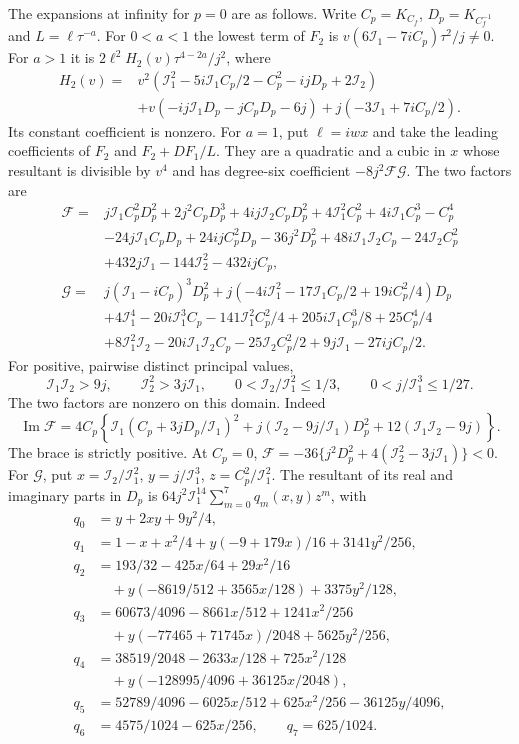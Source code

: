 \documentclass[11pt,a4paper]{article}
\numberwithin{equation}{section}
\theoremstyle{plain}
\theoremstyle{definition}
\theoremstyle{remark}
\begin{document}
The expansions at infinity for $p=0$ are as follows.
Write $C_p=K_{C_f}$, $D_p=K_{C_f^{-1}}$ and $L=\ell\tau^{-a}$.  For $0<a<1$ the
lowest term of $F_2$ is $v(6\mathcal I_1-7iC_p)\tau^2/j\ne0$.  For $a>1$ it is
$2\ell^2H_2(v)\tau^{4-2a}/j^2$, where
\begin{align*}
 H_2(v)={}&v^2(\mathcal I_1^2-5i\mathcal I_1C_p/2-C_p^2-ijD_p+2\mathcal I_2)\\
 &+v(-ij\mathcal I_1D_p-jC_pD_p-6j)+j(-3\mathcal I_1+7iC_p/2).
\end{align*}
Its constant coefficient is nonzero.  For $a=1$, put $\ell=iwx$ and take
the leading coefficients of $F_2$ and $F_2+DF_1/L$.  They are a quadratic
and a cubic in $x$ whose resultant is divisible by $v^4$ and has
degree-six coefficient $-8j^2\mathcal F\mathcal G$.  The two factors are
\begin{align*}
 \mathcal F={}&j\mathcal I_1C_p^2D_p^2+2j^2C_pD_p^3+4ij\mathcal I_2C_pD_p^2
 +4\mathcal I_1^2C_p^2+4i\mathcal I_1C_p^3-C_p^4\\
 &-24j\mathcal I_1C_pD_p+24ijC_p^2D_p-36j^2D_p^2
 +48i\mathcal I_1\mathcal I_2C_p-24\mathcal I_2C_p^2\\
 &+432j\mathcal I_1-144\mathcal I_2^2-432ijC_p,\\
 \mathcal G={}&j(\mathcal I_1-iC_p)^3D_p^2
 +j(-4i\mathcal I_1^2-17\mathcal I_1C_p/2+19iC_p^2/4)D_p\\
 &+4\mathcal I_1^4-20i\mathcal I_1^3C_p-141\mathcal I_1^2C_p^2/4
 +205i\mathcal I_1C_p^3/8+25C_p^4/4\\
 &+8\mathcal I_1^2\mathcal I_2-20i\mathcal I_1\mathcal I_2C_p-25\mathcal I_2C_p^2/2
 +9j\mathcal I_1-27ijC_p/2.
\end{align*}
For positive, pairwise distinct principal values,
\[
 \mathcal I_1\mathcal I_2>9j,\qquad
 \mathcal I_2^2>3j\mathcal I_1,\qquad
 0<\mathcal I_2/\mathcal I_1^2\le1/3,\qquad
 0<j/\mathcal I_1^3\le1/27.
\]
The two factors are nonzero on this domain. Indeed
\[
 \operatorname{Im}\mathcal F=4C_p\left\{
 \mathcal I_1(C_p+3jD_p/\mathcal I_1)^2+j(\mathcal I_2-9j/\mathcal I_1)D_p^2
                      +12(\mathcal I_1\mathcal I_2-9j)\right\}.
\]
The brace is strictly positive.  At $C_p=0$,
$\mathcal F=-36\{j^2D_p^2+4(\mathcal I_2^2-3j\mathcal I_1)\}<0$.
For $\mathcal G$, put $x=\mathcal I_2/\mathcal I_1^2$, $y=j/\mathcal I_1^3$, $z=C_p^2/\mathcal I_1^2$.
The resultant of its real and imaginary parts in $D_p$ is
$64j^2\mathcal I_1^{14}\sum_{m=0}^7q_m(x,y)z^m$, with
\begin{align*}
q_0&=y+2xy+9y^2/4,\\
q_1&=1-x+x^2/4+y(-9+179x)/16+3141y^2/256,\\
q_2&=193/32-425x/64+29x^2/16\\
&\quad+y(-8619/512+3565x/128)+3375y^2/128,\\
q_3&=60673/4096-8661x/512+1241x^2/256\\
&\quad+y(-77465+71745x)/2048+5625y^2/256,\\
q_4&=38519/2048-2633x/128+725x^2/128\\
&\quad+y(-128995/4096+36125x/2048),\\
q_5&=52789/4096-6025x/512+625x^2/256-36125y/4096,\\
q_6&=4575/1024-625x/256,\qquad q_7=625/1024.
\end{align*}
\end{document}
